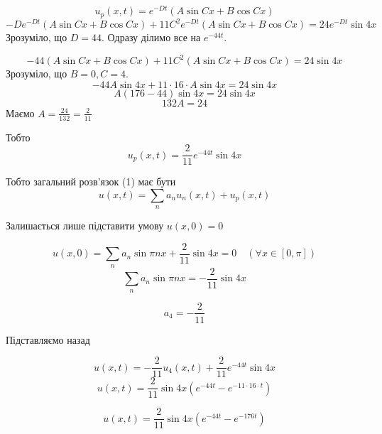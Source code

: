 \documentclass[11pt, a4paper]{article} %
\begin{document}
$$u_p(x,t) = e^{-Dt}(A\sin Cx + B\cos Cx)$$
$$-De^{-Dt}(A\sin Cx + B\cos Cx) + 11 C^2 e^{-Dt} (A \sin Cx + B \cos Cx) = 24 e^{-Dt} \sin 4x$$
Зрозуміло, що $D = 44$. Одразу ділимо все на $e^{-44t}$.

$$-44(A\sin Cx + B\cos Cx) + 11 C^2 (A \sin Cx + B \cos Cx) = 24 \sin 4x$$
Зрозуміло, що $B = 0, C = 4$.
$$-44 A\sin 4x + 11 \cdot 16 \cdot A \sin 4x = 24 \sin 4x$$
$$A(176 - 44) \sin 4x = 24 \sin 4x$$
$$132 A = 24$$
Маємо $A = \frac{24}{132} = \frac{2}{11}$

Тобто $$u_p(x,t) = \frac{2}{11}e^{-44t}\sin 4x$$

Тобто загальний розв'язок (1) має бути
$$u(x,t) = \sum_n a_n u_n(x,t) + u_p(x,t)$$

Залишається лише підставити умову $u(x,0)=0$

$$u(x,0) = \sum_n a_n \sin \pi n x + \frac{2}{11}\sin 4x = 0\quad (\forall x\in[0,\pi])$$
$$\sum_n a_n \sin \pi n x = - \frac{2}{11}\sin 4x$$

$$a_4 = -\frac{2}{11}$$

Підставляємо назад

$$u(x,t) = -\frac{2}{11}u_4(x,t) + \frac{2}{11}e^{-44t}\sin 4x$$
$$u(x,t) = \frac{2}{11}\sin 4x \left(e^{-44t} - e^{-11\cdot 16 \cdot t}\right) $$

\begin{mdframed}[style=ans]
$$u(x,t) = \frac{2}{11}\sin 4x \left(e^{-44t} - e^{-176t}\right) $$
\end{mdframed}
\end{document}
